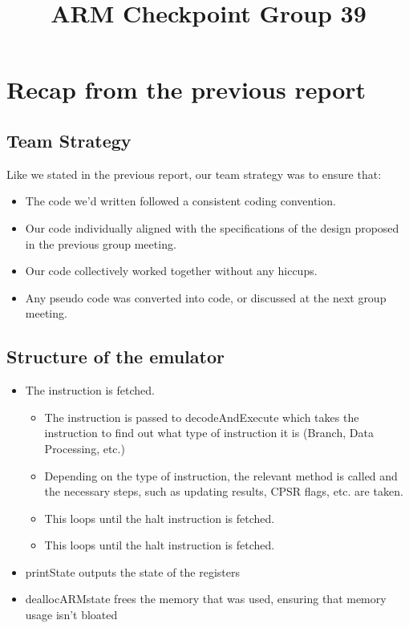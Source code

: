 \documentclass[11pt]{article}
\begin{document}
\title{ARM Checkpoint Group 39}

\maketitle

\section{Recap from the previous report}

\subsection{Team Strategy}

Like we stated in the previous report, our team strategy was to ensure that:

\begin{itemize}

    \item The code we’d written followed a consistent coding convention.
    \item Our code individually aligned with the specifications of the design proposed in the previous group meeting.
    \item Our code collectively worked together without any hiccups.
    \item Any pseudo code was converted into code, or discussed at the next group meeting.

\end{itemize}

\subsection{Structure of the emulator}

\begin{itemize}

    \item The instruction is fetched.
    
    \begin{itemize}
    
        \item The instruction is passed to decodeAndExecute which  takes the instruction to find out what type of instruction it is (Branch, Data Processing, etc.)
        \item Depending on the type of instruction, the relevant method is called and the necessary steps, such as updating results, CPSR flags, etc. are taken.
        \item This loops until the halt instruction is fetched.
        \item This loops until the halt instruction is fetched.
    \end{itemize}
  
    \item printState outputs the state of the registers
    \item deallocARMstate frees the memory that was used, ensuring that memory usage isn't bloated

\end{itemize}
\end{document}
